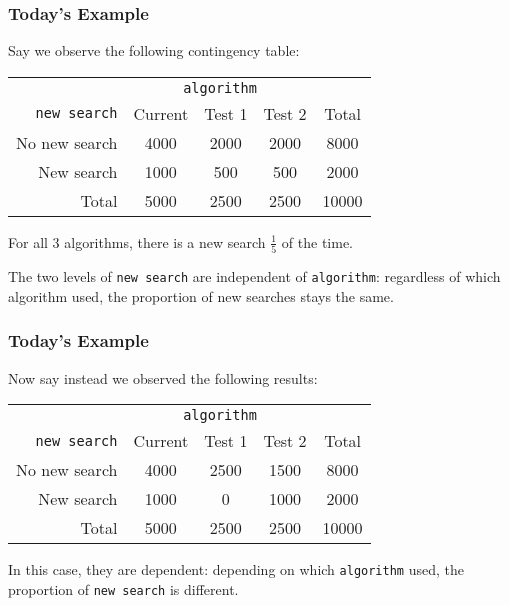 \documentclass[handout]{beamer}
\newcommand{\blue}[1]{\textcolor{blue2}{#1}}
\begin{document}
\begin{frame}
\frametitle{Today's Example}

Say we observe the following contingency table:

\begin{center}
  \begin{tabular}{r|ccc|c}
& \multicolumn{3}{c|}{{\tt algorithm}} & \\
       {\tt new search} & Current & Test 1 & Test 2 & Total \\ 
\hline
    No new search & 4000 & 2000 & 2000 & 8000 \\ 
    New search & 1000 & 500 & 500 & 2000 \\ 
\hline
    Total & 5000 & 2500 & 2500 & 10000 \\ 
  \end{tabular}
\end{center}

\pause For all 3 algorithms, there is a new search $\frac{1}{5}$ of the time.

\vspace{0.25cm}

\pause The two levels of {\tt new search} are \blue{independent} of {\tt algorithm}: regardless of which algorithm used, the proportion of new searches stays the same.

\end{frame}


\begin{frame}
\frametitle{Today's Example}

Now say instead we observed the following results:

\begin{center}
  \begin{tabular}{r|ccc|c}
& \multicolumn{3}{c|}{{\tt algorithm}} & \\
       {\tt new search} & Current & Test 1 & Test 2 & Total \\ 
\hline
    No new search & 4000 & 2500 & 1500 & 8000 \\ 
    New search & 1000 & 0 & 1000 & 2000 \\ 
\hline
    Total & 5000 & 2500 & 2500 & 10000 \\ 
  \end{tabular}
\end{center}

\vspace{0.25cm}

\pause In this case, they are \blue{dependent}: \blue{depending on} which {\tt algorithm} used, the proportion of {\tt new search} \blue{is different}.

\end{frame}
\end{document}
